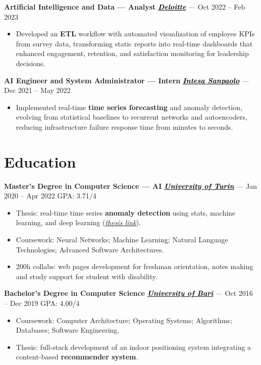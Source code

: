 \documentclass[11pt,a4paper]{article}
\let\OldHref\href
\renewcommand{\href}[2]{\OldHref{#1}{\textit{#2}}}
\begin{document}
{		\textbf{Artificial Intelligence and Data — Analyst} \hfill \href{https://www2.deloitte.com/}{\textbf{\textcolor{black}{Deloitte}}} — Oct 2022 -- Feb 2023
		\begin{itemize}
			\item Developed an \textbf{ETL} workflow with automated visualization of employee KPIs from survey data, transforming static reports into real-time dashboards that enhanced engagement, retention, and satisfaction monitoring for leadership decisions.
		\end{itemize}
		
		\textbf{AI Engineer and System Administrator — Intern} \hfill \href{https://www.intesasanpaolo.com/}{\textbf{\textcolor{black}{Intesa Sanpaolo}}} — Dec 2021 -- May 2022
		\begin{itemize}
			\item Implemented real-time \textbf{time series forecasting} and anomaly detection, evolving from statistical baselines to recurrent networks and autoencoders, reducing infrastructure failure response time from minutes to seconds.
		\end{itemize}
	}
	
	\section*{Education}
	{\small
		\textbf{Master’s Degree in Computer Science — AI} \hfill \href{https://www.unito.it/}{\textbf{\textcolor{black}{University of Turin}}} — Jan 2020 -- Apr 2022 \hfill GPA: 3.71/4
		\begin{itemize}
			\item Thesis: real-time time series \textbf{anomaly detection} using stats, machine learning, and deep learning (\href{https://unitesi.unito.it/handle/20.500.14240/78909}{thesis link}).
			\item Coursework: Neural Networks; Machine Learning; Natural Language Technologies; Advanced Software Architectures.
			\item 200h collabs: web pages development for freshman orientation, notes making and study support for student with disability.
		\end{itemize}
		
		\textbf{Bachelor’s Degree in Computer Science} \hfill \href{https://www.uniba.it/it}{\textbf{\textcolor{black}{University of Bari}}} — Oct 2016 -- Dec 2019 \hfill GPA: 4.00/4
		\begin{itemize}
			\item Coursework: Computer Architecture; Operating Systems; Algorithms; Databases; Software Engineering.
			\item Thesis: full-stack development of an indoor positioning system integrating a content-based \textbf{recommender system}.
		\end{itemize}
	}
	
\end{document}
